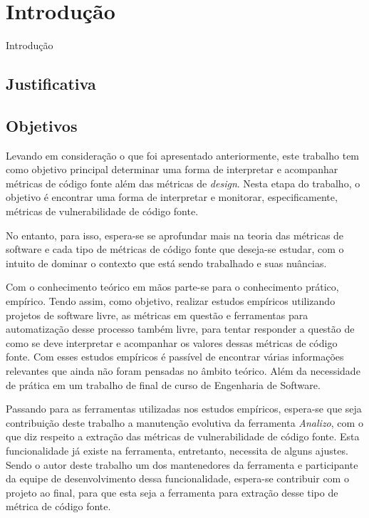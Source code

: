 \chapter{Introdução} \label{cap:introducao}

Introdução

\section{Justificativa}

\section{Objetivos} \label{sec:objetivos}

Levando em consideração o que foi apresentado anteriormente, este trabalho tem
como objetivo principal determinar uma forma de interpretar e acompanhar
métricas de código fonte além das métricas de \textit{design}. Nesta
etapa do trabalho, o objetivo é encontrar uma forma de interpretar e monitorar,
especificamente, métricas de vulnerabilidade de código fonte.

No entanto, para isso, espera-se se aprofundar mais na teoria das métricas de
software e cada tipo de métricas de código fonte que deseja-se estudar, com o 
intuito de dominar o contexto que está sendo trabalhado e suas nuâncias.

Com o conhecimento teórico em mãos parte-se para o conhecimento prático,
empírico. Tendo assim, como objetivo, realizar estudos empíricos utilizando 
projetos de software livre, as métricas em questão e ferramentas para 
automatização desse processo também livre, para tentar responder a questão de 
como se deve interpretar e acompanhar os valores dessas métricas de código fonte.
Com esses estudos empíricos é passível de encontrar várias informações relevantes
que ainda não foram pensadas no âmbito teórico. Além da necessidade de prática
em um trabalho de final de curso de Engenharia de Software.

Passando para as ferramentas utilizadas nos estudos empíricos, espera-se que
seja contribuição deste trabalho a manutenção evolutiva da ferramenta
\emph{Analizo}, com o que diz respeito a extração das métricas de
vulnerabilidade de código fonte. Esta funcionalidade já existe na ferramenta,
entretanto, necessita de alguns ajustes. Sendo o autor deste trabalho um dos
mantenedores da ferramenta e participante da equipe de desenvolvimento dessa
funcionalidade, espera-se contribuir com o projeto ao final, para que esta seja
a ferramenta para extração desse tipo de métrica de código fonte.

